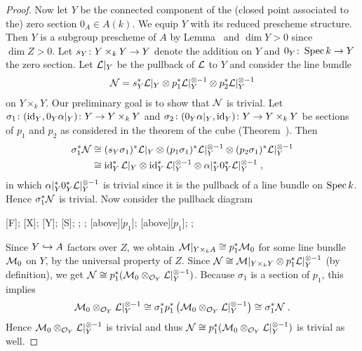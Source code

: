 \documentclass[a4paper,parskip=half,numbers=enddot, DIV=12]{scrreprt}
\begin{document}
\begin{proof}
	 Now let $Y$ be the connected component of the (closed point associated to the) zero section $0_A\in A(k)$. We equip $Y$ with its reduced prescheme structure. Then $Y$ is a subgroup prescheme of $A$ by Lemma~ and $\dim Y>0$ since $\dim Z>0$. Let $s_Y\colon Y\times_kY\morphism Y$ denote the addition on $Y$ and $0_Y\colon \Spec k\morphism Y$ the zero section. Let $\mathcal{L}|_Y$ be the pullback of $\mathcal{L}$ to $Y$ and consider the line bundle
	 \begin{align*}
	 	 \mathcal{N}=s_Y^*\mathcal{L}|_Y\otimes p_1^*\mathcal{L}|_Y^{\otimes-1}\otimes p_2^*\mathcal{L}|_Y^{\otimes-1}
	 \end{align*}
	on $Y\times_kY$. Our preliminary goal is to show that $\mathcal{N}$ is trivial. Let $\sigma_1\colon (\id_Y,0_Y\alpha|_Y)\colon Y\morphism Y\times_kY$ and $\sigma_2\colon (0_Y\alpha|_Y,\id_Y)\colon Y\morphism Y\times_kY$ be sections of $p_1$ and $p_2$ as considered in the theorem of the cube (Theorem~). Then
	\begin{align*}
		\sigma_1^*\mathcal{N}&\cong (s_Y\sigma_1)^*\mathcal{L}|_Y\otimes(p_1\sigma_1)^*\mathcal{L}|_Y^{\otimes -1}\otimes(p_2\sigma_1)^*\mathcal{L}|_Y^{\otimes -1}\\
		&\cong \operatorname{id}_Y^*\mathcal{L}|_Y\otimes\operatorname{id}_Y^*\mathcal{L}|_Y^{\otimes -1}\otimes\alpha|_Y^*0_Y^*\mathcal{L}|_Y^{\otimes -1}\;,
	\end{align*}
	in which $\alpha|_Y^*0_Y^*\mathcal{L}|_Y^{\otimes -1}$ is trivial since it is the pullback of a line bundle on $\operatorname{Spec} k$. Hence $\sigma_1^*\mathcal{N}$ is trivial. Now consider the pullback diagram
	\begin{diagram*}
		[F];
		[X];
		[Y];
		[S];
		;
		\scriptsize
		;
		[above][$p_1$];
		[above][$p_1$];
		;
	\end{diagram*}
	Since $Y\monomorphism A$ factors over $Z$, we obtain $\mathcal{M}|_{Y\times_kA}\cong p_1^*\mathcal{M}_0$ for some line bundle $\mathcal{M}_0$ on $Y$, by the universal property of $Z$. Since $\mathcal{N}\cong \mathcal{M}|_{Y\times_kY}\otimes p_1^*\mathcal{L}|_Y^{\otimes -1}$ (by definition), we get $\mathcal{N}\cong p_1^*(\mathcal{M}_0\otimes_{\mathcal{O}_Y}\mathcal{L}|_Y^{\otimes -1})$. Because $\sigma_1$ is a section of $p_1$, this implies
	\begin{align*}
		\mathcal{M}_0\otimes_{\mathcal{O}_Y}\mathcal{L}|_Y^{\otimes -1}\cong \sigma_1^*p_1^*\left(\mathcal{M}_0\otimes_{\mathcal{O}_Y}\mathcal{L}|_Y^{\otimes -1}\right)\cong \sigma_1^*\mathcal{N}\;.
	\end{align*}
	Hence $\mathcal{M}_0\otimes_{\mathcal{O}_Y}\mathcal{L}|_Y^{\otimes -1}$ is trivial and thus $\mathcal{N}\cong p_1^*(\mathcal{M}_0\otimes_{\mathcal{O}_Y}\mathcal{L}|_Y^{\otimes -1})$ is trivial as well.
	

\end{proof}
\end{document}
